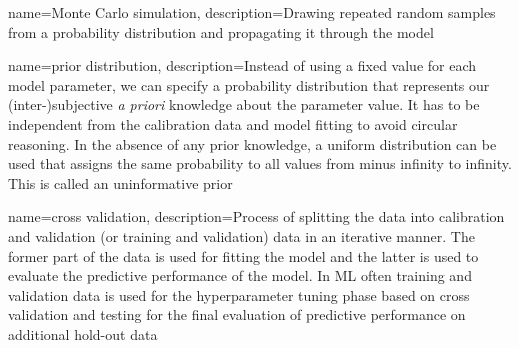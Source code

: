 \documentclass [english,11pt]{article} %
\begin{document}
{
    name=Monte Carlo simulation,
    description={Drawing repeated random samples from a probability distribution and propagating it through the model}
}

{
    name=prior distribution,
    description={Instead of using a fixed value for each model parameter, we can specify a probability distribution that represents our (inter-)subjective \emph{a priori} knowledge about the parameter value. It has to be independent from the calibration data and model fitting to avoid circular reasoning. In the absence of any prior knowledge, a uniform distribution can be used that assigns the same probability to all values from minus infinity to infinity. This is called an uninformative prior}
}

{
    name=cross validation,
    description={Process of splitting the data into calibration and validation (or training and validation) data in an iterative manner. The former part of the data is used for fitting the model and the latter is used to evaluate the predictive performance of the model. In ML often training and validation data is used for the hyperparameter tuning phase based on cross validation and testing for the final evaluation of predictive performance on additional hold-out data}
}
\printglossaries

  
\newpage
\end{document}
